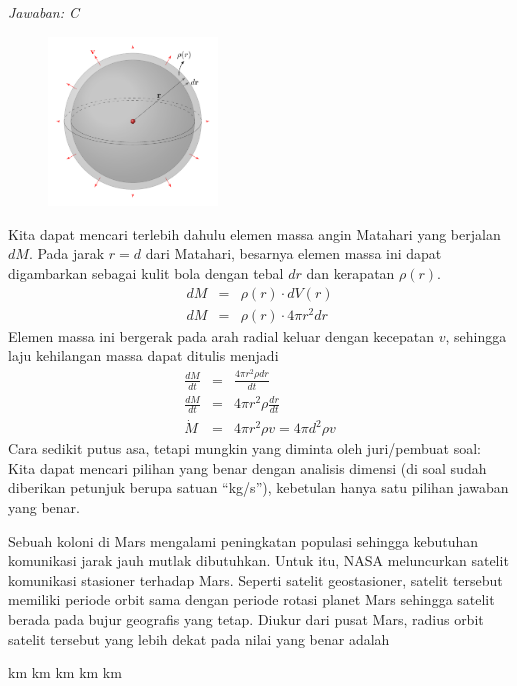 \documentclass[11pt,fleqn, a4paper]{exam}
\begin{document}
\begin{questions}
\textit{Jawaban: C}\\
\begin{figure}[H]
\centering
\includegraphics[width=0.4\textwidth]{gambar/solar_wind.pdf}
\end{figure}
Kita dapat mencari terlebih dahulu elemen massa angin Matahari yang berjalan $dM$. Pada jarak $r = d$ dari Matahari, besarnya elemen massa ini dapat digambarkan sebagai kulit bola dengan tebal $dr$ dan kerapatan $\rho(r)$.
\begin{eqnarray*}
dM &=& \rho(r) \cdot dV(r)\\
dM &=& \rho(r) \cdot 4 \pi r^{2} dr
\end{eqnarray*}
Elemen massa ini bergerak pada arah radial keluar dengan kecepatan $v$, sehingga laju kehilangan massa dapat ditulis menjadi
\begin{eqnarray*}
\frac{dM}{dt} &=& \frac{4 \pi r^2 \rho dr}{dt}\\
\frac{dM}{dt} &=& 4 \pi r^2 \rho \frac{dr}{dt}\\
\dot{M} &=& 4 \pi r^2 \rho v = 4 \pi d^2 \rho v 
\end{eqnarray*}
Cara sedikit putus asa, tetapi mungkin yang diminta oleh juri/pembuat soal:\\
Kita dapat mencari pilihan yang benar dengan analisis dimensi (di soal sudah diberikan petunjuk berupa satuan ``kg/s''), kebetulan hanya satu pilihan jawaban yang benar.

\vspace{0.5cm}
\question Sebuah koloni di Mars mengalami peningkatan populasi sehingga kebutuhan komunikasi jarak jauh mutlak dibutuhkan. Untuk itu, NASA meluncurkan satelit komunikasi stasioner terhadap Mars. Seperti satelit geostasioner, satelit tersebut memiliki periode orbit sama dengan periode rotasi planet Mars sehingga satelit berada pada bujur geografis yang tetap. Diukur dari pusat Mars, radius orbit satelit tersebut yang lebih dekat pada nilai yang benar adalah
\begin{choices}
 km
 km
 km
 km
 km
\end{choices}


\end{questions}
\end{document}
